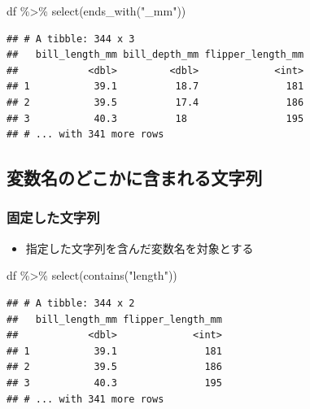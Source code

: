 \documentclass[
  xelatex,ja=standard, b5paper]{bxjsbook}
\newenvironment{Shaded}{\begin{snugshade}}{\end{snugshade}}
\newcommand{\FunctionTok}[1]{\textcolor[rgb]{0.00,0.00,0.00}{#1}}
\newcommand{\NormalTok}[1]{#1}
\newcommand{\SpecialCharTok}[1]{\textcolor[rgb]{0.00,0.00,0.00}{#1}}
\newcommand{\StringTok}[1]{\textcolor[rgb]{0.31,0.60,0.02}{#1}}
\providecommand{\tightlist}{%
  \setlength{\itemsep}{0pt}\setlength{\parskip}{0pt}}
\begin{document}
\begin{Shaded}
\begin{Highlighting}[]
\NormalTok{df }\SpecialCharTok{\%\textgreater{}\%}
  \FunctionTok{select}\NormalTok{(}\FunctionTok{ends\_with}\NormalTok{(}\StringTok{"\_mm"}\NormalTok{))}
\end{Highlighting}
\end{Shaded}

\begin{verbatim}
## # A tibble: 344 x 3
##   bill_length_mm bill_depth_mm flipper_length_mm
##            <dbl>         <dbl>             <int>
## 1           39.1          18.7               181
## 2           39.5          17.4               186
## 3           40.3          18                 195
## # ... with 341 more rows
\end{verbatim}

\hypertarget{select-helper3}{%
\subsection{変数名のどこかに含まれる文字列}\label{select-helper3}}

\hypertarget{ux56faux5b9aux3057ux305fux6587ux5b57ux5217}{%
\subsubsection{固定した文字列}\label{ux56faux5b9aux3057ux305fux6587ux5b57ux5217}}

\begin{itemize}
\tightlist
\item
  指定した文字列を含んだ変数名を対象とする
\end{itemize}

\begin{Shaded}
\begin{Highlighting}[]
\NormalTok{df }\SpecialCharTok{\%\textgreater{}\%}
  \FunctionTok{select}\NormalTok{(}\FunctionTok{contains}\NormalTok{(}\StringTok{"length"}\NormalTok{))}
\end{Highlighting}
\end{Shaded}

\begin{verbatim}
## # A tibble: 344 x 2
##   bill_length_mm flipper_length_mm
##            <dbl>             <int>
## 1           39.1               181
## 2           39.5               186
## 3           40.3               195
## # ... with 341 more rows
\end{verbatim}
\end{document}
